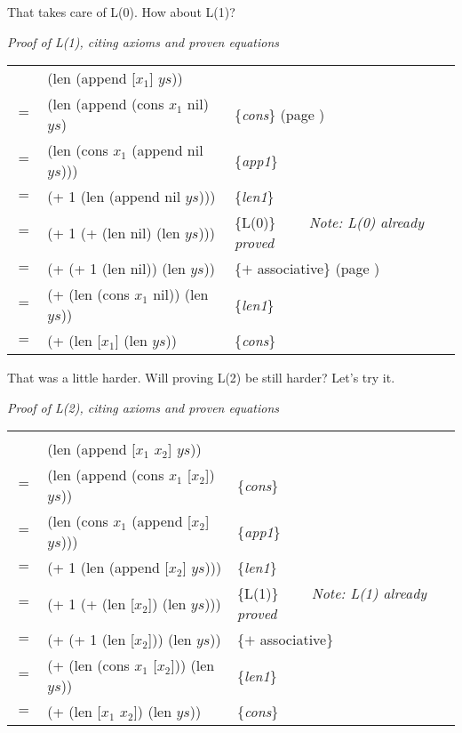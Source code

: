 That takes care of L(0). How about L(1)?

\begin{center}
\emph{Proof of L(1), citing axioms and proven equations} \\
\begin{tabular}{lll}
\hline
    & \textsf{(len (append [$x_1$] $ys$))}           &                     \\
$=$ & \textsf{(len (append (cons $x_1$ nil) $ys$)}   & \{\emph{cons}\} (page \pageref{first-rest-cons}) \\
$=$ & \textsf{(len (cons $x_1$ (append nil $ys$)))}  & \{\emph{app1}\}     \\
$=$ & \textsf{(+ 1 (len (append nil $ys$)))}         & \{\emph{len1}\}     \\
$=$ & \textsf{(+ 1 (+ (len nil) (len $ys$)))}        & \{L(0)\} ~~~~\emph{Note: L(0) already proved}\\
$=$ & \textsf{(+ (+ 1 (len nil)) (len $ys$))}        & \{$+$ associative\} (page \pageref{fig-02-01}) \\
$=$ & \textsf{(+ (len (cons $x_1$ nil)) (len $ys$))} & \{\emph{len1}\}     \\
$=$ & \textsf{(+ (len [$x_1$] (len $ys$))}           & \{\emph{cons}\}     \\
\end{tabular}
\end{center}

That was a little harder. Will proving L(2) be still harder? Let's try it.

\begin{center}
\emph{Proof of L(2), citing axioms and proven equations}\\
\begin{tabular}{lll}
\hline\\[-1.0em]
    & \textsf{(len (append [$x_1$ $x_2$] $ys$))}         &                     \\
$=$ & \textsf{(len (append (cons $x_1$ [$x_2$]) $ys$))}  & \{\emph{cons}\}     \\
$=$ & \textsf{(len (cons $x_1$ (append [$x_2$] $ys$)))}  & \{\emph{app1}\}     \\
$=$ & \textsf{(+ 1 (len (append [$x_2$] $ys$)))}         & \{\emph{len1}\}     \\
$=$ & \textsf{(+ 1 (+ (len [$x_2$]) (len $ys$)))}        & \{L(1)\} ~~~~\emph{Note: L(1) already proved}\\
$=$ & \textsf{(+ (+ 1 (len [$x_2$])) (len $ys$))}        & \{$+$ associative\} \\
$=$ & \textsf{(+ (len (cons $x_1$ [$x_2$])) (len $ys$))} & \{\emph{len1}\}     \\
$=$ & \textsf{(+ (len [$x_1$ $x_2$]) (len $ys$))}        & \{\emph{cons}\}     \\
\end{tabular}
\end{center}

